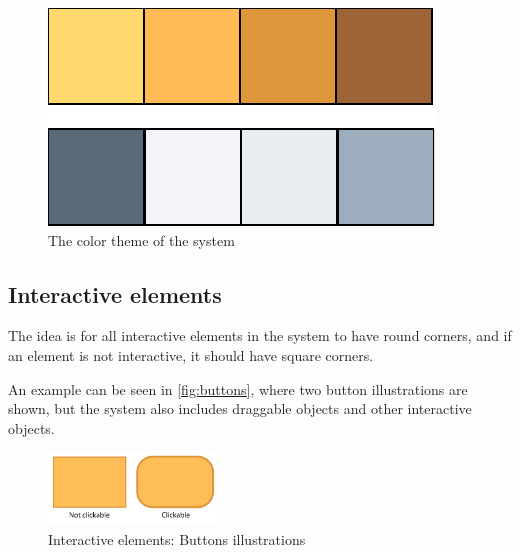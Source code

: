 \begin{figure}[h!]
	\centering
	\includegraphics[width=\textwidth]{gfx/design_color_theme}
	\caption{The color theme of the \giraf[] system}
	\label{fig:colortheme}
\end{figure}

\subsection{Interactive elements}
\label{design:button_design}

The idea is for all interactive elements in the \giraf[] system to have round corners, and if an element is not interactive, it should have square corners.

An example can be seen in \autoref{fig:buttons}, where two button illustrations are shown, but the system also includes draggable objects and other interactive objects.

\begin{figure}[h!]
	\centering
	\includegraphics[width=0.4\textwidth]{gfx/buttons.pdf}
	\caption{Interactive elements: Buttons illustrations}
	\label{fig:buttons}
\end{figure}